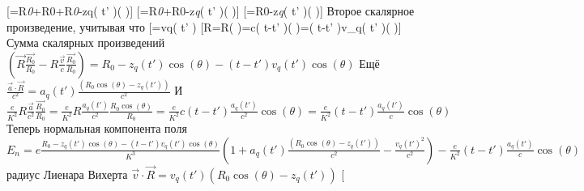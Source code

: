 \documentclass[11pt]{article}
\begin{document}
{[}={{R}\emph{{0}}+{{R}}{0}}+{{R}\emph{{0}}-{{z}}{q}}\left(
t' \right)\cos \left( \theta  \right){]}
{[}={{R}\emph{{0}}+{{R}}{0}}-{{z}\emph{{q}}\left(
t' \right)\cos \left( \theta  \right){]}
{[}={{R}}{0}}-{{z}\emph{{q}}\left(
t' \right)\cos \left( \theta  \right){]} Второе скалярное произведение,
учитывая что {[}={{v}}{q}}\left( t'
\right)\overrightarrow{k}{]}
{[}R=R\cos \left(
\theta  \right)=c\left( t-t'
\right)\cos \left(
\theta  \right)=\left( t-t' \right){{v}\_{q}}\left( t'
\right)\cos \left( \theta  \right){]} Сумма скалярных произведений
\(\left( \overrightarrow{R}\frac{\overrightarrow{{{R}_{0}}}}{{{R}_{0}}}-R\frac{\overrightarrow{v}}{c}\frac{\overrightarrow{{{R}_{0}}}}{{{R}_{0}}} \right)={{R}_{0}}-{{z}_{q}}\left( t' \right)\cos \left( \theta \right)-\left( t-t' \right){{v}_{q}}\left( t' \right)\cos \left( \theta \right)\)
Ещё
\(\frac{\overrightarrow{a}\cdot \overrightarrow{R}}{{{c}^{2}}}={{a}_{q}}\left( t' \right)\frac{\left( {{R}_{0}}\cos \left( \theta \right)-{{z}_{q}}\left( t' \right) \right)}{{{c}^{2}}}\)
И
\(\frac{e}{{{K}^{2}}}R\frac{\overrightarrow{a}}{{{c}^{2}}}\frac{\overrightarrow{{{R}_{0}}}}{{{R}_{0}}}=\frac{e}{{{K}^{2}}}R\frac{{{a}_{q}}\left( t' \right)}{{{c}^{2}}}\frac{{{R}_{0}}\cos \left( \theta \right)}{{{R}_{0}}}=\frac{e}{{{K}^{2}}}c\left( t-t' \right)\frac{{{a}_{q}}\left( t' \right)}{{{c}^{2}}}\cos \left( \theta \right)=\frac{e}{{{K}^{2}}}\left( t-t' \right)\frac{{{a}_{q}}\left( t' \right)}{c}\cos \left( \theta \right)\)
Теперь нормальная компонента поля
\({{E}_{n}}=e\frac{{{R}_{0}}-{{z}_{q}}\left( t' \right)\cos \left( \theta \right)-\left( t-t' \right){{v}_{q}}\left( t' \right)\cos \left( \theta \right)}{{{K}^{3}}}\left( 1+{{a}_{q}}\left( t' \right)\frac{\left( {{R}_{0}}\cos \left( \theta \right)-{{z}_{q}}\left( t' \right) \right)}{{{c}^{2}}}-\frac{{{v}_{q}}{{\left( t' \right)}^{2}}}{{{c}^{2}}} \right)-\frac{e}{{{K}^{2}}}\left( t-t' \right)\frac{{{a}_{q}}\left( t' \right)}{c}\cos \left( \theta \right)\)
радиус Лиенара Вихерта
\(\overrightarrow{v}\cdot \overrightarrow{R}={{v}_{q}}\left( t' \right)\left( {{R}_{0}}\cos \left( \theta \right)-{{z}_{q}}\left( t' \right) \right)\)
{[}
\end{document}
